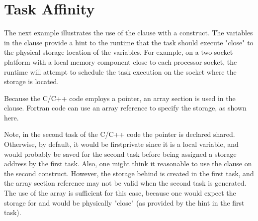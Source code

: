 \section{Task Affinity}
\label{sec: task_affinity}

The next example illustrates the use of the 
clause with a  construct.
The variables in the  clause provide a
hint to the runtime that the task should execute
"close" to the physical storage location of the variables. For example,
on a two-socket platform with a local memory component
close to each processor socket, the runtime will attempt to
schedule the task execution on the socket where the storage is located.

Because the C/C++ code employs a pointer, an array section is used in
the  clause.
Fortran code can use an array reference to specify the storage, as
shown here.

Note, in the second task of the C/C++ code the  pointer is declared
shared.  Otherwise, by default, it would be firstprivate since it is a local
variable, and would probably be saved for the second task before being assigned
a storage address by the first task.  Also, one might think it reasonable to use
the  clause  on the second  construct.
However, the storage behind  is created in the first task, and the 
array section reference may not be valid when the second task is generated.
The use of the  array is sufficient for this case, because one
would expect the storage for  and  would be physically "close"
(as provided by the hint in the first task).



